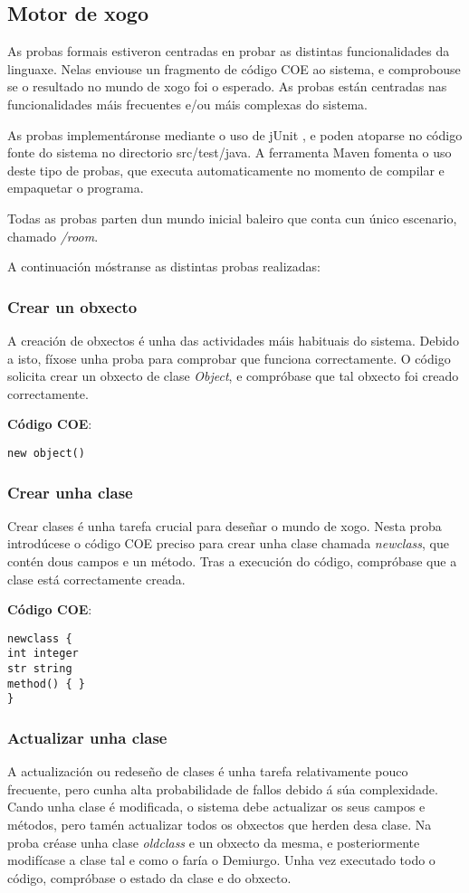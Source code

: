\subsection{Motor de xogo}
As probas formais estiveron centradas en probar as distintas funcionalidades da
linguaxe. Nelas enviouse un fragmento de código COE ao sistema, e comprobouse
se o resultado no mundo de xogo foi o esperado. As probas están centradas nas
funcionalidades máis frecuentes e/ou máis complexas do sistema.
 
As probas implementáronse mediante o uso de jUnit \cite{junit}, e poden atoparse
no código fonte do sistema no directorio src/test/java. A ferramenta Maven
fomenta o uso deste tipo de probas, que executa automaticamente no momento de
compilar e empaquetar o programa.

Todas as probas parten dun mundo inicial baleiro que conta cun único escenario,
chamado \textit{/room}.
 
A continuación móstranse as distintas probas realizadas:
 
\subsubsection{Crear un obxecto}
A creación de obxectos é unha das actividades máis habituais do sistema. Debido
a isto, fíxose unha proba para comprobar que funciona correctamente. O código
solicita crear un obxecto de clase \textit{Object}, e compróbase que tal obxecto
foi creado correctamente.

\textbf{Código COE}:
\begin{lstlisting}
new object()
\end{lstlisting}

\subsubsection{Crear unha clase}
Crear clases é unha tarefa crucial para deseñar o mundo de xogo. Nesta proba
introdúcese o código COE preciso para crear unha clase chamada
\textit{newclass}, que contén dous campos e un método. Tras a execución do
código, compróbase que a clase está correctamente creada.

\textbf{Código COE}:
\begin{lstlisting}
newclass {
int integer
str string
method() { }
}
\end{lstlisting}

\subsubsection{Actualizar unha clase}
A actualización ou redeseño de clases é unha tarefa relativamente pouco
frecuente, pero cunha alta probabilidade de fallos debido á súa complexidade.
Cando unha clase é modificada, o sistema debe actualizar os seus campos e
métodos, pero tamén actualizar todos os obxectos que herden desa clase. Na proba
créase unha clase \textit{oldclass} e un obxecto da mesma, e posteriormente
modifícase a clase tal e como o faría o Demiurgo. Unha vez executado todo o
código, compróbase o estado da clase e do obxecto.

